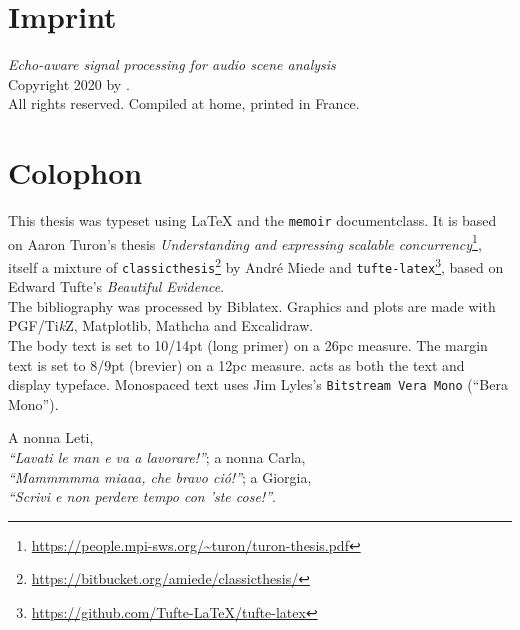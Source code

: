 \thispagestyle{empty}
\hphantom{.}
\vfill

\section*{Imprint}

\textit{Echo-aware signal processing for audio scene analysis}\\
Copyright \textcopyright{} 2020 by \theauthor{}.\\
All rights reserved. Compiled at home, printed in France.\\

\section*{Colophon}

This thesis was typeset using \LaTeX{} and the \texttt{memoir} documentclass.
It is based on Aaron Turon's thesis \emph{Understanding and expressing scalable concurrency}\footnote{\url{https://people.mpi-sws.org/~turon/turon-thesis.pdf}}, itself a mixture of \texttt{classicthesis}\footnote{\url{https://bitbucket.org/amiede/classicthesis/}} by Andr\'e Miede and \texttt{tufte-latex}\footnote{\url{https://github.com/Tufte-LaTeX/tufte-latex}},
 based on Edward Tufte's \emph{Beautiful Evidence}.\\[0.5\baselineskip]
%
The bibliography was processed by Biblatex.
Graphics and plots are made with PGF/Ti\emph{k}Z, Matplotlib, Mathcha and Excalidraw.\\[0.5\baselineskip]
%
The body text is set to 10/14pt (long primer) on a 26pc measure.
The margin text is set to 8/9pt (brevier) on a 12pc measure.
 acts as both the text and display typeface.
Monospaced text uses Jim Lyles's \texttt{Bitstream Vera Mono} (\enquote{Bera Mono}).

\thispagestyle{empty}
\vphantom{.}
\vfill
\begin{dedication}
    A nonna Leti,\\
    \textit{``Lavati le man e va a lavorare!''};
    \vfill
    a nonna Carla,\\
    \textit{``Mammmmma miaaa, che bravo ció!''};
    \vfill
    a Giorgia,\\
    \textit{``Scrivi e non perdere tempo con 'ste cose!''}.
\end{dedication}
\clearpage

